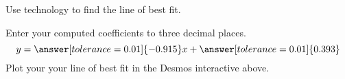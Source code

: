 \documentclass{ximera}
\author{}
\begin{document}
\begin{exercise}
Use technology to find the line of best fit.

\begin{center}  
\end{center}

Enter your computed coefficients to three decimal places.
$$y=\answer[tolerance=0.01]{-0.915}x+\answer[tolerance=0.01]{0.393}$$
Plot your your line of best fit in the Desmos interactive above.

 \end{exercise}
 
\end{document}
